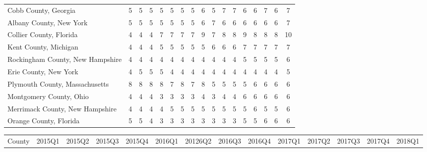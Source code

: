 \begin{landscape}
\begin{longtable}{lcccccccccccccccc}
	Cobb County, Georgia & 5 & 5 & 5 & 5 & 5 & 5 & 5 & 6 & 5 & 7 & 7 & 6 & 6 & 7 & 6 & 7 \\
	Albany County, New York & 5 & 5 & 5 & 5 & 5 & 5 & 5 & 6 & 7 & 6 & 6 & 6 & 6 & 6 & 6 & 7 \\
	Collier County, Florida & 4 & 4 & 4 & 7 & 7 & 7 & 7 & 9 & 7 & 8 & 8 & 9 & 8 & 8 & 8 & 10 \\
	Kent County, Michigan & 4 & 4 & 4 & 5 & 5 & 5 & 5 & 5 & 6 & 6 & 6 & 7 & 7 & 7 & 7 & 7 \\
	Rockingham County, New Hampshire & 4 & 4 & 4 & 4 & 4 & 4 & 4 & 4 & 4 & 4 & 4 & 5 & 5 & 5 & 5 & 6 \\
	Erie County, New York & 4 & 5 & 5 & 5 & 4 & 4 & 4 & 4 & 4 & 4 & 4 & 4 & 4 & 4 & 4 & 5 \\
	Plymouth County, Massachusetts & 8 & 8 & 8 & 8 & 7 & 8 & 7 & 8 & 5 & 5 & 5 & 5 & 6 & 6 & 6 & 6 \\
	Montgomery County, Ohio & 4 & 4 & 4 & 3 & 3 & 3 & 3 & 4 & 3 & 4 & 4 & 6 & 6 & 6 & 6 & 6 \\
	Merrimack County, New Hampshire & 4 & 4 & 4 & 4 & 5 & 5 & 5 & 5 & 5 & 5 & 5 & 5 & 6 & 5 & 5 & 6 \\
	Orange County, Florida & 5 & 5 & 4 & 3 & 3 & 3 & 3 & 3 & 3 & 3 & 3 & 5 & 5 & 6 & 6 & 6

\end{longtable}

\newpage

\begin{longtable}{lccccccccccccc}
	\setlength{\tabcolsep}{8pt}
	County &2015Q1 &2015Q2 &2015Q3 &2015Q4 &2016Q1 &20126Q2 &2016Q3 &2016Q4 &2017Q1 & 2017Q2 &2017Q3 &2017Q4 &2018Q1 \\
	

\end{longtable}
\end{landscape}
